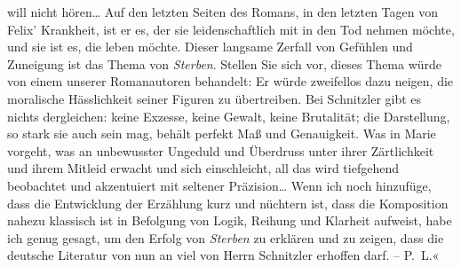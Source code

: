 {{{{{                           will nicht hören{\dots} Auf den letzten Seiten des
                              Romans, in den
                           letzten Tagen von Felix’ Krankheit, ist er es, der sie leidenschaftlich mit in den
                           Tod nehmen möchte, und sie ist es, die leben möchte. Dieser langsame
                           Zerfall von Gefühlen und Zuneigung ist das Thema von \emph{Sterben}. Stellen Sie sich vor, dieses Thema würde von einem unserer
                           Romanautoren behandelt: Er würde zweifellos dazu neigen, die moralische
                           Hässlichkeit seiner Figuren zu übertreiben. Bei Schnitzler gibt es nichts dergleichen: keine
                           Exzesse, keine Gewalt, keine Brutalität; die Darstellung, so stark sie
                           auch sein mag, behält perfekt Maß und Genauigkeit. Was in Marie vorgeht, was an
                           unbewusster Ungeduld und Überdruss unter ihrer Zärtlichkeit und ihrem
                           Mitleid erwacht und sich einschleicht, all das wird tiefgehend beobachtet
                           und akzentuiert mit seltener Präzision{\dots} Wenn
                           ich noch hinzufüge, dass die Entwicklung der Erzählung kurz und nüchtern
                           ist, dass die Komposition nahezu klassisch ist in Befolgung von Logik,
                           Reihung und Klarheit aufweist, habe ich genug gesagt, um den Erfolg von
                              \emph{Sterben} zu erklären und zu zeigen, dass die deutsche Literatur von nun an
                           viel von Herrn Schnitzler erhoffen
                           darf. – P. L.«}}}\label{K_L02731-1}}}\pend
           

